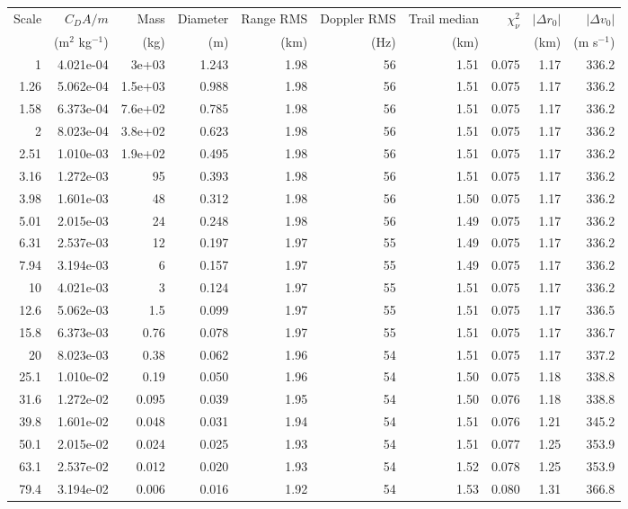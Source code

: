 \begin{tabular}{rrrrrrrrrr}
\toprule
Scale & $C_D A/m$ & Mass & Diameter & Range RMS & Doppler RMS & Trail median & $\chi^2_\nu$ & $|\Delta r_0|$ & $|\Delta v_0|$ \\
 & (m$^2$ kg$^{-1}$) & (kg) & (m) & (km) & (Hz) & (km) & & (km) & (m s$^{-1}$) \\
\midrule
1 & 4.021e-04 & 3e+03 & 1.243 & 1.98 & 56 & 1.51 & 0.075 & 1.17 & 336.2 \\
1.26 & 5.062e-04 & 1.5e+03 & 0.988 & 1.98 & 56 & 1.51 & 0.075 & 1.17 & 336.2 \\
1.58 & 6.373e-04 & 7.6e+02 & 0.785 & 1.98 & 56 & 1.51 & 0.075 & 1.17 & 336.2 \\
2 & 8.023e-04 & 3.8e+02 & 0.623 & 1.98 & 56 & 1.51 & 0.075 & 1.17 & 336.2 \\
2.51 & 1.010e-03 & 1.9e+02 & 0.495 & 1.98 & 56 & 1.51 & 0.075 & 1.17 & 336.2 \\
3.16 & 1.272e-03 & 95 & 0.393 & 1.98 & 56 & 1.51 & 0.075 & 1.17 & 336.2 \\
3.98 & 1.601e-03 & 48 & 0.312 & 1.98 & 56 & 1.50 & 0.075 & 1.17 & 336.2 \\
5.01 & 2.015e-03 & 24 & 0.248 & 1.98 & 56 & 1.49 & 0.075 & 1.17 & 336.2 \\
6.31 & 2.537e-03 & 12 & 0.197 & 1.97 & 55 & 1.49 & 0.075 & 1.17 & 336.2 \\
7.94 & 3.194e-03 & 6 & 0.157 & 1.97 & 55 & 1.49 & 0.075 & 1.17 & 336.2 \\
10 & 4.021e-03 & 3 & 0.124 & 1.97 & 55 & 1.51 & 0.075 & 1.17 & 336.2 \\
12.6 & 5.062e-03 & 1.5 & 0.099 & 1.97 & 55 & 1.51 & 0.075 & 1.17 & 336.5 \\
15.8 & 6.373e-03 & 0.76 & 0.078 & 1.97 & 55 & 1.51 & 0.075 & 1.17 & 336.7 \\
20 & 8.023e-03 & 0.38 & 0.062 & 1.96 & 54 & 1.51 & 0.075 & 1.17 & 337.2 \\
25.1 & 1.010e-02 & 0.19 & 0.050 & 1.96 & 54 & 1.50 & 0.075 & 1.18 & 338.8 \\
31.6 & 1.272e-02 & 0.095 & 0.039 & 1.95 & 54 & 1.50 & 0.076 & 1.18 & 338.8 \\
39.8 & 1.601e-02 & 0.048 & 0.031 & 1.94 & 54 & 1.51 & 0.076 & 1.21 & 345.2 \\
50.1 & 2.015e-02 & 0.024 & 0.025 & 1.93 & 54 & 1.51 & 0.077 & 1.25 & 353.9 \\
63.1 & 2.537e-02 & 0.012 & 0.020 & 1.93 & 54 & 1.52 & 0.078 & 1.25 & 353.9 \\
79.4 & 3.194e-02 & 0.006 & 0.016 & 1.92 & 54 & 1.53 & 0.080 & 1.31 & 366.8 \\

\end{tabular}
